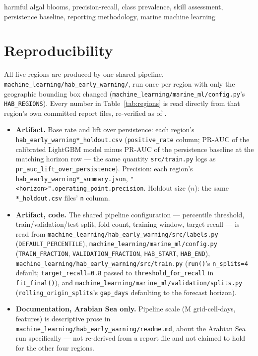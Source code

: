 \documentclass[conference]{IEEEtran}
\begin{document}
\begin{IEEEkeywords}
harmful algal blooms, precision-recall, class prevalence, skill assessment,
persistence baseline, reporting methodology, marine machine learning
\end{IEEEkeywords}



\section*{Reproducibility}
All five regions are produced by one shared pipeline,
\texttt{machine\_learning/hab\_early\_warning/}, run once per region with
only the geographic bounding box changed
(\texttt{machine\_learning/marine\_ml/config.py}'s \texttt{HAB\_REGIONS}).
Every number in Table~\ref{tab:regions} is read directly from that region's
own committed report files, re-verified as of \AsOf{}.
{\raggedright\sloppy
\begin{itemize}\itemsep1pt\parskip0pt
\item[] \textbf{Artifact.} Base rate and lift over persistence: each
region's \texttt{hab\_early\_warning\allowbreak{}*\_holdout.csv}
(\texttt{positive\_rate} column; PR-AUC of the calibrated LightGBM model
minus PR-AUC of the persistence baseline at the matching horizon row --- the
same quantity \texttt{src/train.py} logs as
\texttt{pr\_auc\_lift\_over\_persistence}). Precision: each region's
\texttt{hab\_early\_warning\allowbreak{}*\_summary.json},
\texttt{"<horizon>"\allowbreak{}.operating\_point.precision}. Holdout size
($n$): the same \texttt{*\_holdout.csv} files' \texttt{n} column.
\item[] \textbf{Artifact, code.} The shared pipeline configuration ---
percentile threshold, train/validation/test split, fold count, training
window, target recall --- is read from
\texttt{machine\_learning/hab\_early\_warning/\allowbreak{}src/labels.py}
(\texttt{DEFAULT\_PERCENTILE}),
\texttt{machine\_learning/marine\_ml/\allowbreak{}config.py}
(\texttt{TRAIN\_FRACTION}, \texttt{VALIDATION\_FRACTION}, \texttt{HAB\_START},
\texttt{HAB\_END}),
\texttt{machine\_learning/hab\_early\_warning/\allowbreak{}src/train.py}
(\texttt{run()}'s \texttt{n\_splits=4} default;
\texttt{target\_recall=0.8} passed to \texttt{threshold\_for\_recall} in
\texttt{fit\_final()}), and
\texttt{machine\_learning/marine\_ml/\allowbreak{}validation/splits.py}
(\texttt{rolling\_origin\_splits}'s \texttt{gap\_days} defaulting to the
forecast horizon).
\item[] \textbf{Documentation, Arabian Sea only.} Pipeline scale
(\HabArabianGridCellDays{}M grid-cell-days, \HabArabianFeatureCount{}
features) is descriptive prose in
\texttt{machine\_learning/hab\_early\_warning/\allowbreak{}readme.md}, about
the Arabian Sea run specifically --- not re-derived from a report file and
not claimed to hold for the other four regions.
\end{itemize}}



\end{document}
